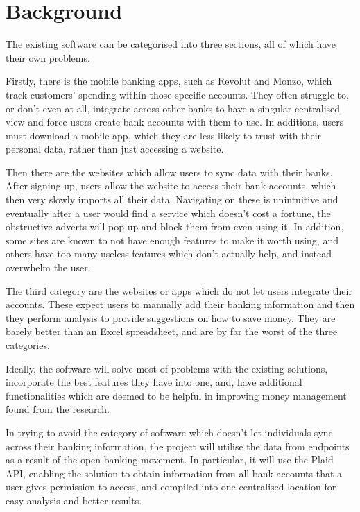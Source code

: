 \section{Background}
The existing software can be categorised into three sections, all of which have their own problems. 

Firstly, there is the mobile banking apps, such as Revolut and Monzo, which track customers' spending within those specific accounts. They often struggle to, or don't even at all, integrate across other banks to have a singular centralised view and force users create bank accounts with them to use. In additions, users must download a mobile app, which they are less likely to trust with their personal data, rather than just accessing a website.

Then there are the websites which allow users to sync data with their banks. After signing up, users allow the website to access their bank accounts, which then very slowly imports all their data. Navigating on these is unintuitive and eventually after a user would find a service which doesn't cost a fortune, the obstructive adverts will pop up and block them from even using it. In addition, some sites are known to not have enough features to make it worth using, and others have too many useless features which don't actually help, and instead overwhelm the user.

The third category are the websites or apps which do not let users integrate their accounts. These expect users to manually add their banking information and then they perform analysis to provide suggestions on how to save money. They are barely better than an Excel spreadsheet, and are by far the worst of the three categories.

Ideally, the software will solve most of problems with the existing solutions, incorporate the best features they have into one, and, have additional functionalities which are deemed to be helpful in improving money management found from the research.

In trying to avoid the category of software which doesn't let individuals sync across their banking information, the project will utilise the data from endpoints as a result of the open banking movement. In particular, it will use the Plaid API, enabling the solution to obtain information from all bank accounts that a user gives permission to access, and compiled into one centralised location for easy analysis and better results.